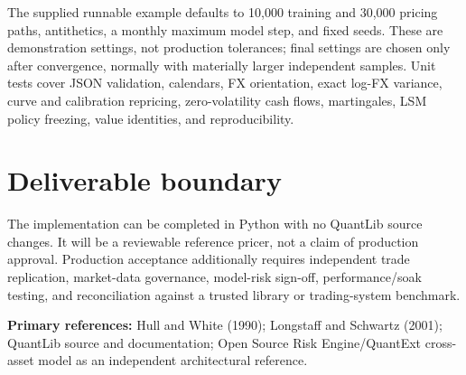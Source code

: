 \documentclass[conference]{IEEEtran}
\begin{document}
The supplied runnable example defaults to 10,000 training and 30,000 pricing paths, antithetics, a monthly maximum model step, and fixed seeds. These are demonstration settings, not production tolerances; final settings are chosen only after convergence, normally with materially larger independent samples. Unit tests cover JSON validation, calendars, FX orientation, exact log-FX variance, curve and calibration repricing, zero-volatility cash flows, martingales, LSM policy freezing, value identities, and reproducibility.

\section{Deliverable boundary}

The implementation can be completed in Python with no QuantLib source changes. It will be a reviewable reference pricer, not a claim of production approval. Production acceptance additionally requires independent trade replication, market-data governance, model-risk sign-off, performance/soak testing, and reconciliation against a trusted library or trading-system benchmark.

\textbf{Primary references:} Hull and White (1990); Longstaff and Schwartz (2001); QuantLib source and documentation; Open Source Risk Engine/QuantExt cross-asset model as an independent architectural reference.
\end{document}
